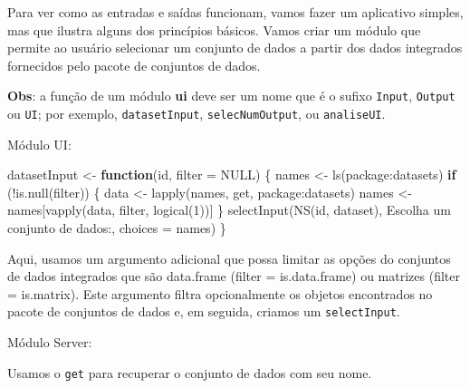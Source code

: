 \documentclass[
]{book}
\newenvironment{Shaded}{\begin{snugshade}}{\end{snugshade}}
\newcommand{\AttributeTok}[1]{\textcolor[rgb]{0.77,0.63,0.00}{#1}}
\newcommand{\ConstantTok}[1]{\textcolor[rgb]{0.00,0.00,0.00}{#1}}
\newcommand{\ControlFlowTok}[1]{\textcolor[rgb]{0.13,0.29,0.53}{\textbf{#1}}}
\newcommand{\DecValTok}[1]{\textcolor[rgb]{0.00,0.00,0.81}{#1}}
\newcommand{\FunctionTok}[1]{\textcolor[rgb]{0.00,0.00,0.00}{#1}}
\newcommand{\NormalTok}[1]{#1}
\newcommand{\OtherTok}[1]{\textcolor[rgb]{0.56,0.35,0.01}{#1}}
\newcommand{\SpecialCharTok}[1]{\textcolor[rgb]{0.00,0.00,0.00}{#1}}
\newcommand{\StringTok}[1]{\textcolor[rgb]{0.31,0.60,0.02}{#1}}
\begin{document}
Para ver como as entradas e saídas funcionam, vamos fazer um aplicativo simples, mas que ilustra alguns dos princípios básicos. Vamos criar um módulo que permite ao usuário selecionar um conjunto de dados a partir dos dados integrados fornecidos pelo pacote de conjuntos de dados.

\textbf{Obs}: a função de um módulo \textbf{ui} deve ser um nome que é o sufixo \texttt{Input}, \texttt{Output} ou \texttt{UI}; por exemplo, \texttt{datasetInput}, \texttt{selecNumOutput}, ou \texttt{analiseUI}.

Módulo UI:

\begin{Shaded}
\begin{Highlighting}[]
\NormalTok{datasetInput }\OtherTok{\textless{}{-}} \ControlFlowTok{function}\NormalTok{(id, }\AttributeTok{filter =} \ConstantTok{NULL}\NormalTok{) \{}
\NormalTok{  names }\OtherTok{\textless{}{-}} \FunctionTok{ls}\NormalTok{(}\StringTok{\textquotesingle{}package:datasets\textquotesingle{}}\NormalTok{)}
  \ControlFlowTok{if}\NormalTok{ (}\SpecialCharTok{!}\FunctionTok{is.null}\NormalTok{(filter)) \{}
\NormalTok{    data }\OtherTok{\textless{}{-}} \FunctionTok{lapply}\NormalTok{(names, get, }\StringTok{\textquotesingle{}package:datasets\textquotesingle{}}\NormalTok{)}
\NormalTok{    names }\OtherTok{\textless{}{-}}\NormalTok{ names[}\FunctionTok{vapply}\NormalTok{(data, filter, }\FunctionTok{logical}\NormalTok{(}\DecValTok{1}\NormalTok{))]}
\NormalTok{  \}}
  \FunctionTok{selectInput}\NormalTok{(}\FunctionTok{NS}\NormalTok{(id, }\StringTok{\textquotesingle{}dataset\textquotesingle{}}\NormalTok{), }\StringTok{\textquotesingle{}Escolha um conjunto de dados:\textquotesingle{}}\NormalTok{, }\AttributeTok{choices =}\NormalTok{ names)}
\NormalTok{\}}
\end{Highlighting}
\end{Shaded}

Aqui, usamos um argumento adicional que possa limitar as opções do conjuntos de dados integrados que são data.frame (filter = is.data.frame) ou matrizes (filter = is.matrix). Este argumento filtra opcionalmente os objetos encontrados no pacote de conjuntos de dados e, em seguida, criamos um \texttt{selectInput}.

Módulo Server:

Usamos o \texttt{get} para recuperar o conjunto de dados com seu nome.

\begin{Shaded}
\end{Shaded}
\end{document}
